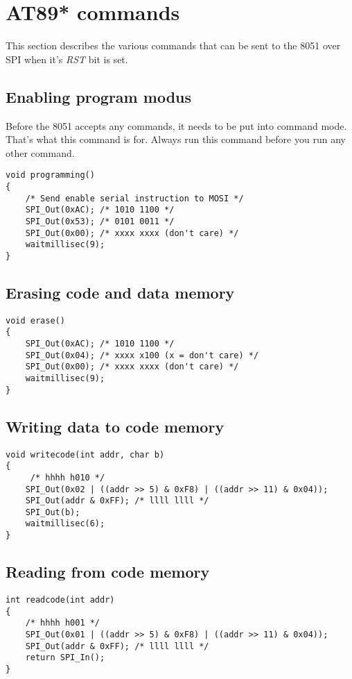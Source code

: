 \documentclass[a4paper]{article}
\begin{document}
\section{AT89* commands}

This section describes the various commands that can be sent 
to the 8051 over SPI when it's {\em RST} bit is set.

\subsection{Enabling program modus}

Before the 8051 accepts any commands, it needs to be put into command mode.
That's what this command is for. Always run this command before you 
run any other command.

\begin{lstlisting}
void programming()
{
	/* Send enable serial instruction to MOSI */
	SPI_Out(0xAC); /* 1010 1100 */
	SPI_Out(0x53); /* 0101 0011 */
	SPI_Out(0x00); /* xxxx xxxx (don't care) */
	waitmillisec(9);
}
\end{lstlisting}

\subsection{Erasing code and data memory}

\begin{lstlisting}
void erase()
{
	SPI_Out(0xAC); /* 1010 1100 */
	SPI_Out(0x04); /* xxxx x100 (x = don't care) */
	SPI_Out(0x00); /* xxxx xxxx (don't care) */
	waitmillisec(9);
}
\end{lstlisting}


\subsection{Writing data to code memory}

\begin{lstlisting}
void writecode(int addr, char b)
{
     /* hhhh h010 */
	SPI_Out(0x02 | ((addr >> 5) & 0xF8) | ((addr >> 11) & 0x04));
	SPI_Out(addr & 0xFF); /* llll llll */
	SPI_Out(b);
	waitmillisec(6);
}
\end{lstlisting}

\subsection{Reading from code memory}

\begin{lstlisting}
int readcode(int addr)
{
    /* hhhh h001 */
	SPI_Out(0x01 | ((addr >> 5) & 0xF8) | ((addr >> 11) & 0x04));
	SPI_Out(addr & 0xFF); /* llll llll */
	return SPI_In();
}
\end{lstlisting}
\end{document}
